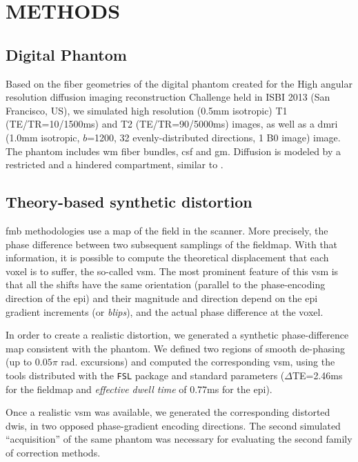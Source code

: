 \section{METHODS}

\subsection{Digital Phantom}
Based on the fiber geometries of the digital phantom 
created for the High angular resolution diffusion imaging 
reconstruction Challenge held in ISBI 2013 
(San Francisco, US), we simulated high resolution 
(0.5mm isotropic) T1 (TE/TR=10/1500ms) and T2 
(TE/TR=90/5000ms) images, as well as a \gls*{dmri}
(1.0mm isotropic, $b$=1200, 32 evenly-distributed 
directions, 1 B0 image) image.
The phantom includes \gls*{wm} fiber bundles, 
\gls*{csf} and \gls*{gm}. Diffusion is modeled by a 
restricted and a hindered compartment, similar to
\cite{assaf_composite_2005}.

\subsection{Theory-based synthetic distortion}

\Gls*{fmb} methodologies use a map
of the field in the scanner. More precisely, the
phase difference between two subsequent samplings
of the fieldmap. With that information, it is possible
to compute the theoretical displacement that each
voxel is to suffer, the so-called \gls*{vsm}. The
most prominent feature of this \gls*{vsm} is that all
the shifts have the same orientation (parallel to the
phase-encoding direction of the \gls*{epi}) and their
magnitude and direction depend on the \gls*{epi} 
gradient increments (or \emph{blips}), and the actual
phase difference at the voxel.

In order to create a realistic distortion, we
generated a synthetic phase-difference map 
consistent with the phantom.  We defined two regions 
of smooth de-phasing (up to $0.05\pi$ rad. excursions) 
and computed the corresponding \gls*{vsm}, using the 
tools distributed with the \texttt{FSL} package 
\cite{jenkinson_fsl_2012}  and
standard parameters ($\Delta$TE=2.46ms for the
fieldmap and \emph{effective dwell time} of 
0.77ms for the \gls*{epi}).

Once a realistic \gls*{vsm} was available, we generated
the corresponding distorted \glspl*{dwi}, in two opposed
phase-gradient encoding directions. The second simulated
``acquisition'' of the same phantom was necessary 
for evaluating the second family of correction methods.

